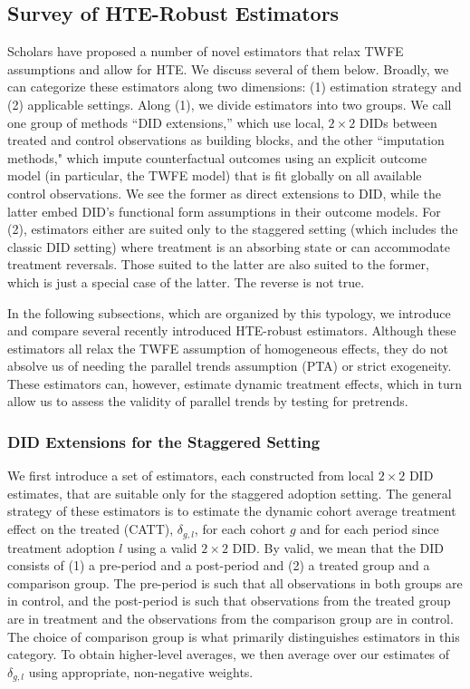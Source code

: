 \documentclass[12pt]{article}
\begin{document}
\clearpage





\subsection{Survey of HTE-Robust Estimators}
Scholars have proposed a number of novel estimators that relax TWFE assumptions and allow for HTE. We discuss several of them below. Broadly, we can categorize these estimators along two dimensions: (1) estimation strategy and (2) applicable settings. Along (1), we divide estimators into two groups. We call one group of methods ``DID extensions,'' which use local, $2\times2$ DIDs between treated and control observations as building blocks, and the other ``imputation methods," which impute counterfactual outcomes using an explicit outcome model (in particular, the TWFE model) that is fit globally on all available control observations. 
We see the former as direct extensions to DID, while the latter embed DID's functional form assumptions in their outcome models. 
For (2), estimators either are suited only to the staggered setting (which includes the classic DID setting) where treatment is an absorbing state or can accommodate treatment reversals. Those suited to the latter are also suited to the former, which is just a special case of the latter. The reverse is not true.

In the following subsections, which are organized by this typology, we introduce and compare several recently introduced HTE-robust estimators. Although these estimators all relax the TWFE assumption of homogeneous effects, they do not absolve us of needing the parallel trends assumption (PTA) or strict exogeneity. These estimators can, however, estimate dynamic treatment effects, which in turn allow us to assess the validity of parallel trends by testing for pretrends. 

\subsubsection{DID Extensions for the Staggered Setting}

We first introduce a set of estimators, each constructed from local $2 \times 2$ DID estimates, that are suitable only for the staggered adoption setting. The general strategy of these estimators is to estimate the dynamic cohort average treatment effect on the treated (CATT), $\delta_{g,l}$, for each cohort $g$ and for each period since treatment adoption $l$ using a valid $2 \times 2$ DID. By valid, we mean that the DID consists of (1) a pre-period and a post-period and (2) a treated group and a comparison group. The pre-period is such that all observations in both groups are in control, and the post-period is such that observations from the treated group are in treatment and the observations from the comparison group are in control. The choice of comparison group is what primarily distinguishes estimators in this category. To obtain higher-level averages, we then average over our estimates of $\delta_{g,l}$ using appropriate, non-negative weights.
\end{document}
